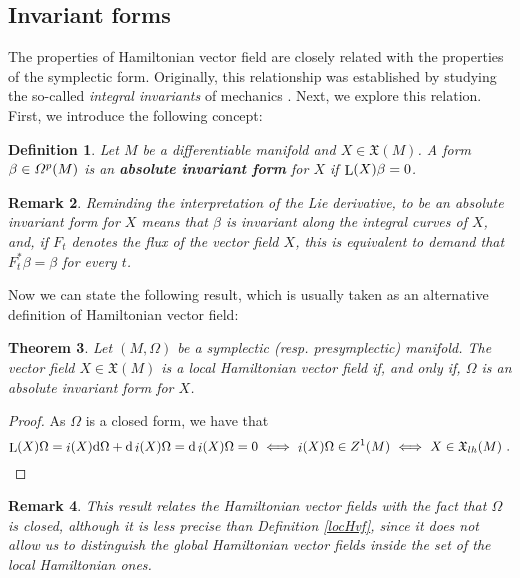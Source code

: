 \documentclass[12pt]{report}
\newtheorem{teor}{Theorem}[chapter]
\newtheorem{definition}[teor]{Definition}
\newtheorem{remark}[teor]{Remark}
\def\qed{\ifvmode\removelastskip\fi
{\unskip\nobreak\hfil\penalty50\hbox{}\nobreak\hfil
\hbox{\vrule height1.2ex width1.2ex}\parfillskip=0pt
\finalhyphendemerits=0 \par\smallskip}}
\def\vf{\mathfrak X}
\def\df{{\mit\Omega}}
\def\d{{\rm d}}
\def\Lie{\mathop{\rm L}\nolimits}
\def\inn{\mathop{i}\nolimits}
\begin{document}
\subsection{Invariant forms}


The properties of Hamiltonian vector field are closely related with the properties
of the symplectic form. 
Originally, this relationship was established by studying the so-called {\sl integral invariants} of mechanics \cite{Ca-22,DG-80,Ga-70}.
Next, we explore this relation.
First, we introduce the following concept:

\begin{definition}
Let $M$ be a differentiable manifold and $X \in \vf (M)$.
A form $\beta \in \df^p(M)$ is an \textbf{absolute invariant form}
for $X$ if $\Lie (X)\beta = 0$.
\end{definition}

\begin{remark}{\rm  
Reminding the interpretation of the Lie derivative,
to be an absolute invariant form for $X$ means that
$\beta$ is invariant along the integral curves of $X$,
and, if $F_t$ denotes the flux of the vector field $X$,
this is equivalent to demand that $F_t^*\beta = \beta$ for every $t$.
}\end{remark}

Now we can state the following result, which is usually taken 
as an alternative definition of Hamiltonian vector field:

\begin{teor}
Let $(M,\Omega )$ be a symplectic (resp. presymplectic) manifold.
The vector field $X \in \vf (M)$ is a
local Hamiltonian vector field if, and only if,
$\Omega$ is an absolute invariant form for $X$.
\label{teoin}
\end{teor}
\begin{proof}
As $\Omega$ is a closed form, we have that
$$
\Lie (X)\Omega = \inn (X)\d \Omega + \d\inn (X)\Omega =
\d\inn (X)\Omega = 0
\ \Longleftrightarrow \  \inn (X)\Omega \in Z^1(M)
\ \Longleftrightarrow \ X \in \vf_{lh}(M) \ .
$$
\qed  \end{proof}

\begin{remark}{\rm 
This result relates the Hamiltonian vector fields with the fact that $\Omega$
is closed, although it is less precise than Definition \ref{locHvf},
since it does not allow us to distinguish the global Hamiltonian vector fields inside the set of the local Hamiltonian ones.
}\end{remark}
\end{document}
